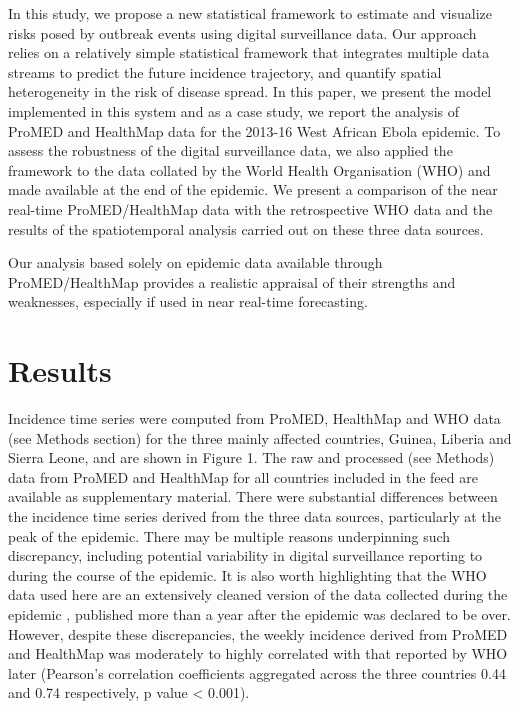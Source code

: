 \documentclass[9pt,twocolumn,twoside,lineno]{pnas-new}
\begin{document}
In this study, we propose a new statistical framework to estimate and
visualize risks posed by outbreak events using digital surveillance
data. Our approach relies on a relatively simple statistical framework
that integrates multiple data streams to predict the future incidence
trajectory, and quantify spatial heterogeneity in the risk of disease
spread. In this paper, we present the model implemented in this system
and as a case study, we report the analysis of ProMED and HealthMap data
for the 2013-16 West African Ebola epidemic. To assess the robustness of
the digital surveillance data, we also applied the framework to the data
collated by the World Health Organisation (WHO) and made available at
the end of the epidemic. We present a comparison of the near real-time
ProMED/HealthMap data with the retrospective WHO data and the results of
the spatiotemporal analysis carried out on these three data sources.

Our analysis based solely on epidemic data available through
ProMED/HealthMap provides a realistic appraisal of their strengths and
weaknesses, especially if used in near real-time forecasting.

\section*{Results}

Incidence time series were computed from ProMED, HealthMap and WHO data
(see Methods section) for the three mainly affected countries, Guinea,
Liberia and Sierra Leone, and are shown in Figure 1. The raw and
processed (see Methods) data from ProMED and HealthMap for all countries
included in the feed are available as supplementary material. There were
substantial differences between the incidence time series derived from
the three data sources, particularly at the peak of the epidemic. There
may be multiple reasons underpinning such discrepancy, including
potential variability in digital surveillance reporting to during the
course of the epidemic. It is also worth highlighting that the WHO data
used here are an extensively cleaned version of the data collected
during the epidemic \cite{who2014ebola, team2015west}, published
more than a year after the epidemic was declared to be over. However,
despite these discrepancies, the weekly incidence derived from ProMED
and HealthMap was moderately to highly correlated with that reported by
WHO later (Pearson's correlation coefficients aggregated across the
three countries 0.44 and 0.74 respectively, p value \textless{} 0.001).
\end{document}
